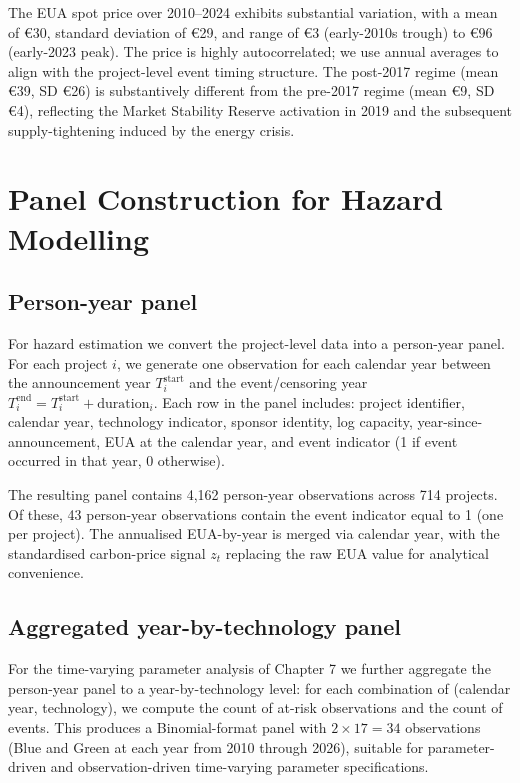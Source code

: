The EUA spot price over 2010--2024 exhibits substantial variation, with a mean of \euro 30, standard deviation of \euro 29, and range of \euro 3 (early-2010s trough) to \euro 96 (early-2023 peak). The price is highly autocorrelated; we use annual averages to align with the project-level event timing structure. The post-2017 regime (mean \euro 39, SD \euro 26) is substantively different from the pre-2017 regime (mean \euro 9, SD \euro 4), reflecting the Market Stability Reserve activation in 2019 and the subsequent supply-tightening induced by the energy crisis.

\section{Panel Construction for Hazard Modelling}
\label{sec:ch4-panel}

\subsection{Person-year panel}

For hazard estimation we convert the project-level data into a person-year panel. For each project $i$, we generate one observation for each calendar year between the announcement year $T^{\mathrm{start}}_i$ and the event/censoring year $T^{\mathrm{end}}_i = T^{\mathrm{start}}_i + \mathrm{duration}_i$. Each row in the panel includes: project identifier, calendar year, technology indicator, sponsor identity, log capacity, year-since-announcement, EUA at the calendar year, and event indicator (1 if event occurred in that year, 0 otherwise).

The resulting panel contains 4,162 person-year observations across 714 projects. Of these, 43 person-year observations contain the event indicator equal to 1 (one per project). The annualised EUA-by-year is merged via calendar year, with the standardised carbon-price signal $z_t$ replacing the raw EUA value for analytical convenience.

\subsection{Aggregated year-by-technology panel}

For the time-varying parameter analysis of Chapter 7 we further aggregate the person-year panel to a year-by-technology level: for each combination of (calendar year, technology), we compute the count of at-risk observations and the count of events. This produces a Binomial-format panel with $2 \times 17 = 34$ observations (Blue and Green at each year from 2010 through 2026), suitable for parameter-driven and observation-driven time-varying parameter specifications.

